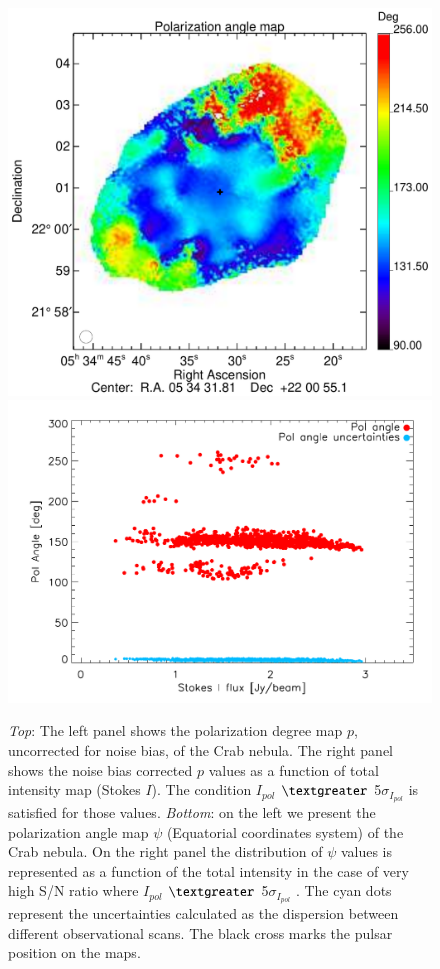 \documentclass[twocolumn,traditabstract]{aa}
\begin{document}
\begin{figure}
\includegraphics[clip, angle=0, scale = 0.35]{figures/Crab_angle_v3_2mm.pdf}
\includegraphics[clip, angle=0, scale = 0.5]{figures/pol_angle_vs_I_2mm.pdf}
\caption{{\it Top}: The left panel shows the polarization
  degree map $p$, uncorrected for noise bias, of the Crab nebula. The right panel shows the noise bias
  corrected $p$ values as a function of total intensity map (Stokes $I$). The
  condition $I_{pol}$ $\textgreater$ 5$\sigma_{I_{pol}}$ is satisfied for those values. {\it
    Bottom}: on the left we present the polarization angle map $\psi$ (Equatorial coordinates system) of the
  Crab nebula. On the right panel the distribution of $\psi$ values is
  represented as a function of the total intensity in the case of very high S/N ratio where $I_{pol}$ $\textgreater$ 5$\sigma_{I_{pol}}$ . The cyan dots represent the uncertainties calculated as the
  dispersion between different observational scans. The black cross marks the pulsar position on the maps.}
\label{fig:pol_degree}
\end{figure}
\end{document}

